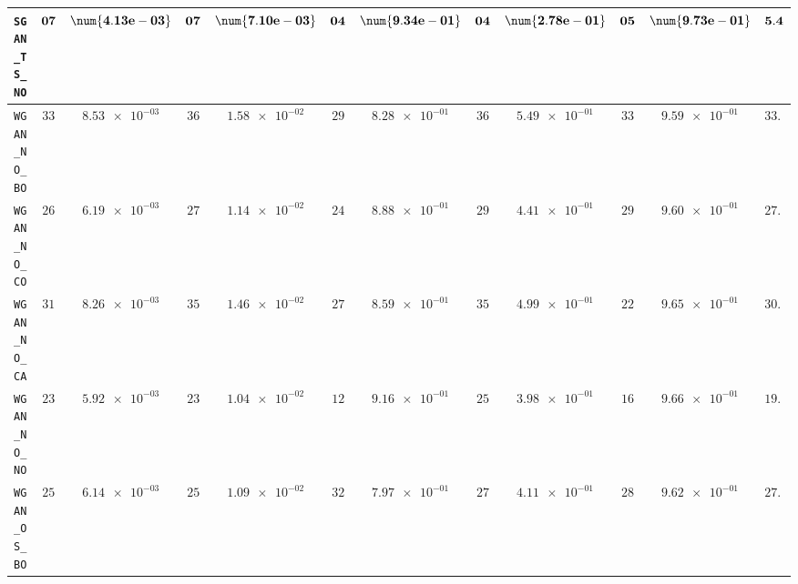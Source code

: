 \begin{table}[H]
\begin{tabularx}{\textwidth}{l||cC|cC|cC|cC|cC||c}
		\texttt{SGAN\_TS\_NO} & $\bf 07$ & $\bf \num{4.13e-03}$ & $\bf 07$ & $\bf \num{7.10e-03}$ & $\bf 04$ & $\bf \num{9.34e-01}$ & $\bf 04$ & $\bf \num{2.78e-01}$ & $\bf 05$ & $\bf \num{9.73e-01}$ & $\bf 5.4$  \\ \hline
		\texttt{WGAN\_NO\_BO} & $ 33$ & $ \num{8.53e-03}$ & $ 36$ & $ \num{1.58e-02}$ & $ 29$ & $ \num{8.28e-01}$ & $ 36$ & $ \num{5.49e-01}$ & $ 33$ & $ \num{9.59e-01}$ & $ 33.4$  \\
		\texttt{WGAN\_NO\_CO} & $ 26$ & $ \num{6.19e-03}$ & $ 27$ & $ \num{1.14e-02}$ & $ 24$ & $ \num{8.88e-01}$ & $ 29$ & $ \num{4.41e-01}$ & $ 29$ & $ \num{9.60e-01}$ & $ 27.0$  \\
		\texttt{WGAN\_NO\_CA} & $ 31$ & $ \num{8.26e-03}$ & $ 35$ & $ \num{1.46e-02}$ & $ 27$ & $ \num{8.59e-01}$ & $ 35$ & $ \num{4.99e-01}$ & $ 22$ & $ \num{9.65e-01}$ & $ 30.0$  \\
		\texttt{WGAN\_NO\_NO} & $ 23$ & $ \num{5.92e-03}$ & $ 23$ & $ \num{1.04e-02}$ & $ 12$ & $ \num{9.16e-01}$ & $ 25$ & $ \num{3.98e-01}$ & $ 16$ & $ \num{9.66e-01}$ & $ 19.8$  \\
		\texttt{WGAN\_OS\_BO} & $ 25$ & $ \num{6.14e-03}$ & $ 25$ & $ \num{1.09e-02}$ & $ 32$ & $ \num{7.97e-01}$ & $ 27$ & $ \num{4.11e-01}$ & $ 28$ & $ \num{9.62e-01}$ & $ 27.4$  \\

\end{tabularx}
\end{table}
